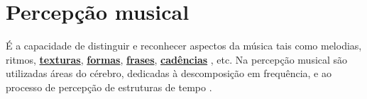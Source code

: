 
\chapter{Percepção musical}
\label{cap:percepcaomusical}
\begin{definition} 
\label{def:PercepcaoMusical}
É a capacidade de distinguir e reconhecer aspectos da música 
tais como melodias, ritmos, \hyperref[sec:texturasmusica]{\textbf{texturas}}, 
\hyperref[sec:FormaMusical]{\textbf{formas}}, 
\hyperref[sec:Frase]{\textbf{frases}}, 
\hyperref[sec:Cadencia]{\textbf{cadências}} \cite[pp. 29]{teoriamusicala2012}, etc.
Na percepção musical são utilizadas áreas do cérebro, 
dedicadas à descomposição em frequência,
e ao processo de percepção de estruturas de tempo \cite{de2019especializacao}.
\end{definition}










